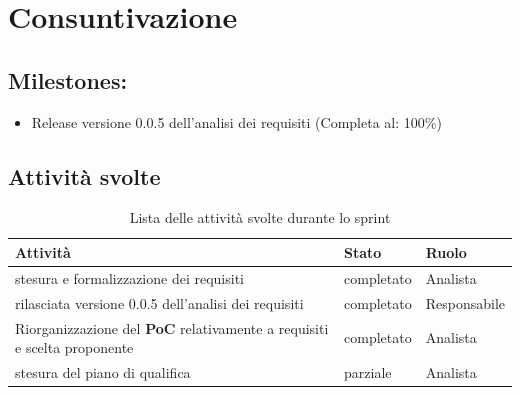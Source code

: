 \section{Consuntivazione}

\subsection{Milestones:}
\begin{itemize}
    \item Release versione 0.0.5 dell'analisi dei requisiti (Completa al: 100\%)
\end{itemize}

\subsection{Attività svolte}

\begin{table}[H]
    \begin{xltabular}{\textwidth}{X l l}
        
         \textbf{Attività} & \textbf{Stato} & \textbf{Ruolo}\\
        \endhead
        \hline
        stesura e formalizzazione dei requisiti & completato & Analista \\
        rilasciata versione 0.0.5 dell'analisi dei requisiti & completato & Responsabile \\
        Riorganizzazione del \textbf{PoC} relativamente a requisiti e scelta proponente & completato & Analista \\
        stesura del piano di qualifica & parziale & Analista \\
    \end{xltabular}
    \caption{Lista delle attività svolte durante lo sprint}
\end{table}


